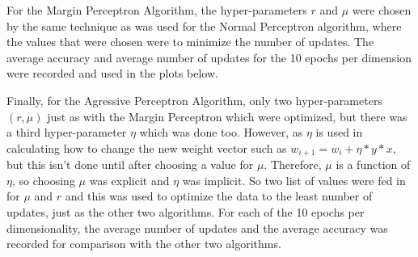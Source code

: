 \begin{enumerate}
For the Margin Perceptron Algorithm, the hyper-parameters $r$ and $\mu$ were chosen
by the same technique as was used for the Normal Perceptron algorithm, where the values
that were chosen were to minimize the number of updates. The average accuracy and
average number of updates for the 10 epochs per dimension were recorded and used
in the plots below.

Finally, for the Agressive Perceptron Algorithm, only two hyper-parameters $(r, \mu)$
just as with the Margin Perceptron which were optimized, but there was a third
hyper-parameter $\eta$ which was done too. However, as $\eta$ is used in calculating
how to change the new weight vector such as $w_{i+1} = w_{i} + \eta * y * x$, but
this isn't done until after choosing a value for $\mu$. Therefore, $\mu$ is a function
of $\eta$, so choosing $\mu$ was explicit and $\eta$ was implicit. So two list of
values were fed in for $\mu$ and $r$ and this was used to optimize the data to
the least number of updates, just as the other two algorithms. For each of the 10
epochs per dimensionality, the average number of updates and the average accuracy
was recorded for comparison with the other two algorithms.



\end{enumerate}
